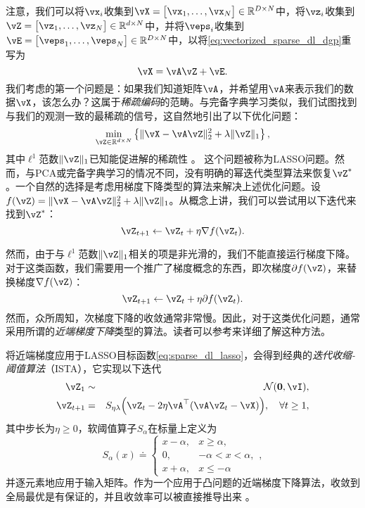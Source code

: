\documentclass[../../book-main.tex]{subfiles}
\begin{document}
注意，我们可以将\(\vx_{i}\)收集到\(\vX = \mat{\vx_{1}, \dots, \vx_{N}} \in \R^{D \times N}\)中，将\(\vz_{i}\)收集到\(\vZ = \mat{\vz_{1}, \dots, \vz_{N}} \in \R^{d  \times N}\)中，并将\(\veps_{i}\)收集到\(\vE = \mat{\veps_{1}, \dots, \veps_{N}} \in \R^{D \times N}\)中，以将\eqref{eq:vectorized_sparse_dl_dgp}重写为
\begin{equation}\label{eq:sparse_dl_dgp}
    \vX = \vA\vZ + \vE.
\end{equation}
我们考虑的第一个问题是：如果我们知道矩阵\(\vA\)，并希望用\(\vA\)来表示我们的数据\(\vX\)，该怎么办？这属于\textit{稀疏编码}的范畴。与完备字典学习类似，我们试图找到与我们的观测一致的最稀疏的信号，这自然地引出了以下优化问题：
\begin{equation}\label{eq:sparse_dl_lasso}
    \min_{\vZ \in \R^{d \times N}}\bc{\norm{\vX - \vA\vZ}_{2}^{2} + \lambda \norm{\vZ}_{1}},
\end{equation}
其中\(\ell^1\)范数\(\norm{\vZ}_{1}\)已知能促进解的稀疏性 \cite{Wright-Ma-2022}。
这个问题被称为LASSO问题。然而，与PCA或完备字典学习的情况不同，没有明确的幂迭代类型算法来恢复\(\vZ^{\ast}\)。一个自然的选择是考虑用梯度下降类型的算法来解决上述优化问题。设\(f(\vZ) = \norm{\vX - \vA\vZ}_{2}^{2} + \lambda \norm{\vZ}_{1}\)。从概念上讲，我们可以尝试用以下迭代来找到\(\vZ^{\ast}\)：
\begin{equation}
    \vZ_{t+1} \leftarrow \vZ_t + \eta \nabla f(\vZ_t).
\end{equation}

然而，由于与\(\ell^1\)范数\(\norm{\vZ}_{1}\)相关的项是非光滑的，我们不能直接运行梯度下降。对于这类函数，我们需要用一个推广了梯度概念的东西，即次梯度\(\partial f(\vZ)\)，来替换梯度\(\nabla f(\vZ)\)：
\begin{equation}
    \vZ_{t+1} \leftarrow \vZ_t + \eta \partial f(\vZ_t).
\end{equation}
然而，众所周知，次梯度下降的收敛通常非常慢。因此，对于这类优化问题，通常采用所谓的\textit{近端梯度下降}类型的算法。读者可以参考\cite{Wright-Ma-2022}来详细了解这种方法。

将近端梯度应用于LASSO目标函数\eqref{eq:sparse_dl_lasso}，会得到经典的\textit{迭代收缩-阈值算法}（ISTA），它实现以下迭代
\begin{eqnarray}
    \vZ_{1} &\sim& \dNorm(\vzero, \vI), \\
    \vZ_{t + 1} &=& S_{\eta\lambda}\rp{\vZ_{t} - 2\eta \vA^{\top}(\vA\vZ_{t} - \vX)}, \quad \forall t \geq 1,\label{eq:ista_update}
\end{eqnarray}
其中步长为\(\eta \geq 0\)，软阈值算子\(S_{\alpha}\)在标量上定义为
\begin{equation}
    S_{\alpha}(x) \doteq \begin{cases}x - \alpha, & x \geq \alpha, \\ 0, & -\alpha < x < \alpha, \\ x + \alpha, & x \leq -\alpha\end{cases},
\end{equation}
并逐元素地应用于输入矩阵。作为一个应用于凸问题的近端梯度下降算法，收敛到全局最优是有保证的，并且收敛率可以被直接推导出来 \cite{Wright-Ma-2022}。
\end{document}
